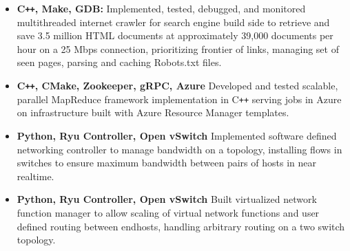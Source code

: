 \documentclass[overlapped]{res}
\begin{document}
\begin{resume}
\begin{itemize}[label={}]  \itemsep -2pt %
    \item \textbf{C\texttt{++}, Make, GDB:}
        Implemented, tested, debugged, and monitored multithreaded internet crawler
        for search engine build side to retrieve and save 3.5 million HTML documents
        at approximately 39,000 documents per hour on a 25 Mbps connection,
        prioritizing frontier of links, managing set of seen pages, parsing and caching Robots.txt files.
    \item \textbf{C\texttt{++}, CMake, Zookeeper, gRPC, Azure}
        Developed and tested scalable, parallel MapReduce framework implementation in C\texttt{++}
        serving jobs in Azure on infrastructure built with Azure Resource Manager templates.
    \item \textbf{Python, Ryu Controller, Open vSwitch}
        Implemented software defined networking controller to manage bandwidth on a topology, installing flows
        in switches to ensure maximum bandwidth between pairs of hosts in near realtime.
    \item \textbf{Python, Ryu Controller, Open vSwitch}
        Built virtualized network function manager to allow scaling of virtual network functions and 
        user defined routing between endhosts, handling arbitrary routing on a two switch topology.

\end{itemize}
\end{resume}
\end{document}
